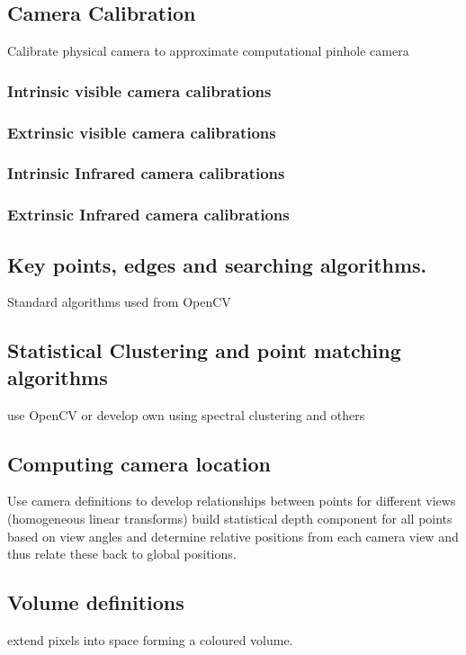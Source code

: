 \documentclass[11pt]{article}
\begin{document}
	\subsection{Camera Calibration}
		Calibrate physical camera to approximate computational pinhole camera

		\subsubsection{Intrinsic visible camera calibrations}

		\subsubsection{Extrinsic visible camera calibrations}

		\subsubsection{Intrinsic Infrared camera calibrations}

		\subsubsection{Extrinsic Infrared camera calibrations}

	\subsection{Key points, edges and searching algorithms.}
		Standard algorithms used from OpenCV

	\subsection{Statistical Clustering and point matching algorithms}
		use OpenCV or develop own using spectral clustering and others

	\subsection{Computing camera location}
		Use camera definitions to develop relationships between points for different views (homogeneous linear transforms) build statistical depth component for all points based on view angles and determine relative positions from each camera view and thus relate these back to global positions.

	\subsection{Volume definitions} 
		extend pixels into space forming a coloured volume.
\end{document}
